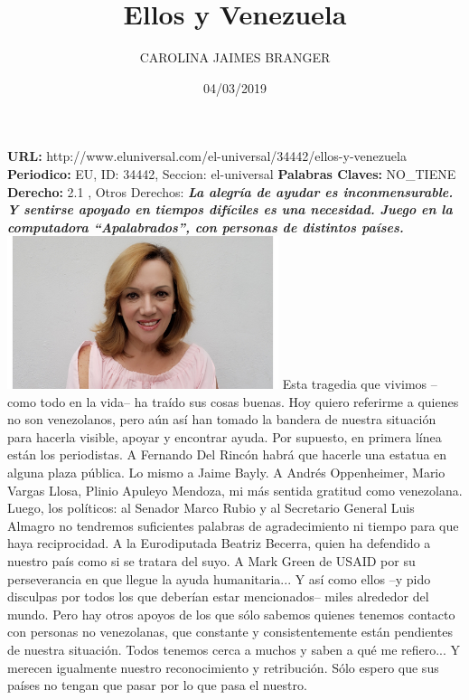 \documentclass{article}%
\title{\textbf{Ellos y Venezuela}}%
\author{CAROLINA JAIMES BRANGER}%
\date{04/03/2019}%
\begin{document}
%
\normalsize%
\maketitle%
\textbf{URL: }%
http://www.eluniversal.com/el{-}universal/34442/ellos{-}y{-}venezuela\newline%
%
\textbf{Periodico: }%
EU, %
ID: %
34442, %
Seccion: %
el{-}universal\newline%
%
\textbf{Palabras Claves: }%
NO\_TIENE\newline%
%
\textbf{Derecho: }%
2.1%
, Otros Derechos: %
\newline%
%
\textbf{\textit{La alegría de ayudar es inconmensurable. Y sentirse apoyado en tiempos difíciles es una necesidad. Juego en la computadora “Apalabrados”, con personas de distintos países.}}%
\newline%
\newline%
%
\includegraphics[width=300px]{EU_34442.jpg}%
\newline%
%
Esta tragedia que vivimos –como todo en la vida– ha traído sus cosas buenas. Hoy quiero referirme a quienes no son venezolanos, pero aún así han tomado la bandera de nuestra situación para hacerla visible, apoyar y encontrar ayuda.%
\newline%
%
Por supuesto, en primera línea están los periodistas. A Fernando Del Rincón habrá que hacerle una estatua en alguna plaza pública. Lo mismo a Jaime Bayly. A Andrés Oppenheimer, Mario Vargas Llosa, Plinio Apuleyo Mendoza, mi más sentida gratitud como venezolana. Luego, los políticos: al Senador Marco Rubio y al Secretario General Luis Almagro no tendremos suficientes palabras de agradecimiento ni tiempo para que haya reciprocidad. A la Eurodiputada Beatriz Becerra, quien ha defendido a nuestro país como si se tratara del suyo. A Mark Green de USAID por su perseverancia en que llegue la ayuda humanitaria... Y así como ellos –y pido disculpas por todos los que deberían estar mencionados– miles alrededor del mundo.%
\newline%
%
Pero hay otros apoyos de los que sólo sabemos quienes tenemos contacto con personas no venezolanas, que constante y consistentemente están pendientes de nuestra situación. Todos tenemos cerca a muchos y saben a qué me refiero... Y merecen igualmente nuestro reconocimiento y retribución. Sólo espero que sus países no tengan que pasar por lo que pasa el nuestro.%
\end{document}
